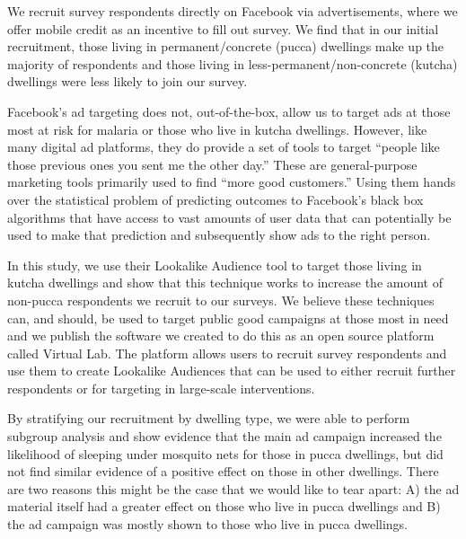 \documentclass[a4paper,12pt]{article}
\begin{document}
We recruit survey respondents directly on Facebook via advertisements, where we offer mobile credit as an incentive to fill out survey. We find that in our initial recruitment, those living in permanent/concrete (pucca) dwellings make up the majority of respondents and those living in less-permanent/non-concrete (kutcha) dwellings were less likely to join our survey.

Facebook's ad targeting does not, out-of-the-box, allow us to target ads at those most at risk for malaria or those who live in kutcha dwellings. However, like many digital ad platforms, they do provide a set of tools to target ``people like those previous ones you sent me the other day.'' These are general-purpose marketing tools primarily used to find ``more good customers.'' Using them hands over the statistical problem of predicting outcomes to Facebook's black box algorithms that have access to vast amounts of user data that can potentially be used to make that prediction and subsequently show ads to the right person.

In this study, we use their Lookalike Audience tool to target those living in kutcha dwellings and show that this technique works to increase the amount of non-pucca respondents we recruit to our surveys. We believe these techniques can, and should, be used to target public good campaigns at those most in need and we publish the software we created to do this as an open source platform called Virtual Lab. The platform allows users to recruit survey respondents and use them to create Lookalike Audiences that can be used to either recruit further respondents or for targeting in large-scale interventions.

By stratifying our recruitment by dwelling type, we were able to perform subgroup analysis and show evidence that the main ad campaign increased the likelihood of sleeping under mosquito nets for those in pucca dwellings, but did not find similar evidence of a positive effect on those in other dwellings. There are two reasons this might be the case that we would like to tear apart: A) the ad material itself had a greater effect on those who live in pucca dwellings and B) the ad campaign was mostly shown to those who live in pucca dwellings.

\end{document}
